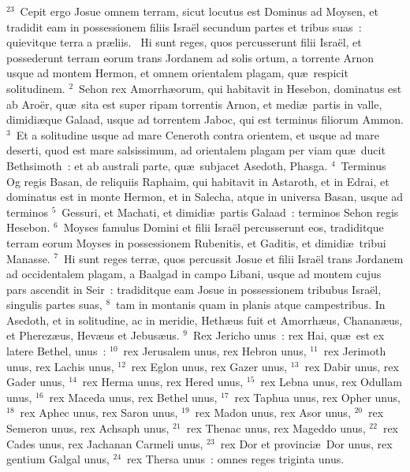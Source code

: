${}^{23}$~Cepit ergo Josue omnem terram, sicut locutus est Dominus ad Moysen, et tradidit eam in possessionem filiis Isra\"el secundum partes et tribus suas~: quievitque terra a pr\ae liis.
~\lettrine[lines=10,image=true,loversize=0.05,lraise=-0.03]{H}{}i sunt reges, quos percusserunt filii Isra\"el, et possederunt terram eorum trans Jordanem ad solis ortum, a torrente Arnon usque ad montem Hermon, et omnem orientalem plagam, qu\ae\ respicit solitudinem.
${}^{2}$~Sehon rex Amorrh\ae orum, qui habitavit in Hesebon, dominatus est ab Aro\"er, qu\ae\ sita est super ripam torrentis Arnon, et medi\ae\ partis in valle, dimidi\ae que Galaad, usque ad torrentem Jaboc, qui est terminus filiorum Ammon.
${}^{3}$~Et a solitudine usque ad mare Ceneroth contra orientem, et usque ad mare deserti, quod est mare salsissimum, ad orientalem plagam per viam qu\ae\ ducit Bethsimoth~: et ab australi parte, qu\ae\ subjacet Asedoth, Phasga.
${}^{4}$~Terminus Og regis Basan, de reliquiis Raphaim, qui habitavit in Astaroth, et in Edrai, et dominatus est in monte Hermon, et in Salecha, atque in universa Basan, usque ad terminos
${}^{5}$~Gessuri, et Machati, et dimidi\ae\ partis Galaad~: terminos Sehon regis Hesebon.
${}^{6}$~Moyses famulus Domini et filii Isra\"el percusserunt eos, tradiditque terram eorum Moyses in possessionem Rubenitis, et Gaditis, et dimidi\ae\ tribui Manasse.
${}^{7}$~Hi sunt reges terr\ae , quos percussit Josue et filii Isra\"el trans Jordanem ad occidentalem plagam, a Baalgad in campo Libani, usque ad montem cujus pars ascendit in Seir~: tradiditque eam Josue in possessionem tribubus Isra\"el, singulis partes suas,
${}^{8}$~tam in montanis quam in planis atque campestribus. In Asedoth, et in solitudine, ac in meridie, Heth\ae us fuit et Amorrh\ae us, Chanan\ae us, et Pherez\ae us, Hev\ae us et Jebus\ae us.
${}^{9}$~Rex Jericho unus~: rex Hai, qu\ae\ est ex latere Bethel, unus~:
${}^{10}$~rex Jerusalem unus, rex Hebron unus,
${}^{11}$~rex Jerimoth unus, rex Lachis unus,
${}^{12}$~rex Eglon unus, rex Gazer unus,
${}^{13}$~rex Dabir unus, rex Gader unus,
${}^{14}$~rex Herma unus, rex Hered unus,
${}^{15}$~rex Lebna unus, rex Odullam unus,
${}^{16}$~rex Maceda unus, rex Bethel unus,
${}^{17}$~rex Taphua unus, rex Opher unus,
${}^{18}$~rex Aphec unus, rex Saron unus,
${}^{19}$~rex Madon unus, rex Asor unus,
${}^{20}$~rex Semeron unus, rex Achsaph unus,
${}^{21}$~rex Thenac unus, rex Mageddo unus,
${}^{22}$~rex Cades unus, rex Jachanan Carmeli unus,
${}^{23}$~rex Dor et provinci\ae\ Dor unus, rex gentium Galgal unus,
${}^{24}$~rex Thersa unus~: omnes reges triginta unus.
